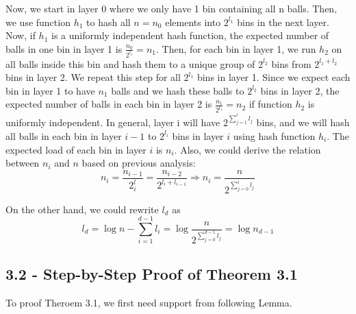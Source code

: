 \documentclass[a4paper, english]{paper}
\begin{document}
	Now, we start in layer 0 where we only have 1 bin containing all n balls. Then, we use function $h_1$ to hash all $n=n_0$ elements into $2^{l_1}$ bins in the next layer. Now, if $h_1$ is a uniformly independent hash function, the expected number of balls in one bin in layer 1 is $\frac{n_0}{2^{l_1}}=n_1$. Then, for each bin in layer 1, we run $h_2$ on all balls inside this bin and hash them to a unique group of $2^{l_2}$ bins from $2^{l_1+l_2}$ bins in layer 2. We repeat this step for all $2^{l_1}$ bins in layer 1. Since we expect each bin in layer 1 to have $n_1$ balls and we hash these balls to $2^{l_2}$ bins in layer 2, the expected number of balls in each bin in layer 2 is $\frac{n_1}{2^{l_1}}=n_2$ if function $h_2$ is uniformly independent. In general, layer i will have $2^{\sum_{j=1}^{i}l_j}$ bins, and we will hash all balls in each bin in layer $i-1$ to $2^{l_i}$ bins in layer $i$ using hash function $h_i$. The expected load of each bin in layer $i$ is $n_i$. Also, we could derive the relation between $n_i$ and $n$ based on previous analysis:
$$n_i = \frac{n_{i-1}}{2^l_i} = \frac{n_{i-2}}{2^{l_i+l_{i-1}}} \Rightarrow n_i = \frac{n}{2^{\sum_{j=0}^i l_j}}$$\par
 On the other hand, we could rewrite $l_d$ as $$l_d = \log n - \sum_{i=1}^{d-1}l_i = \log\frac{n}{2^{\sum_{j=0}^{d-1} l_j}} =\log n_{d-1}$$

 	\subsection{3.2 - Step-by-Step Proof of Theorem 3.1}
	\quad To proof Theroem 3.1, we first need support from following Lemma.\\
	
\end{document}
